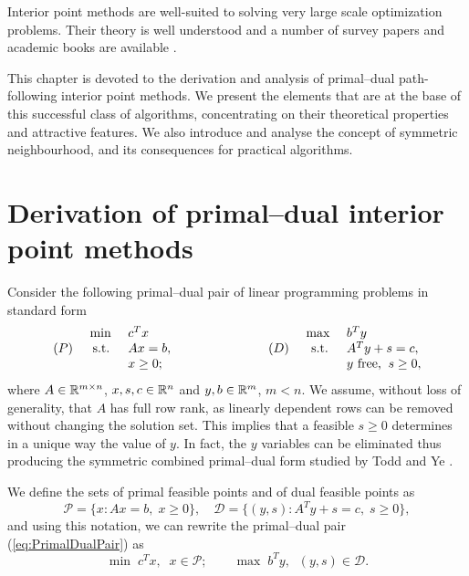 
%
%
\label{ch:Ipm}

Interior point methods are well-suited to solving very
large scale optimization problems. Their theory is well understood
and a number of survey papers and academic books are available
\cite{GondzioTerlaky,Gonzaga92,
RoosTerlakyVial,Terlaky96,MWright92,ipm:Wright97}.

This chapter is devoted to the derivation and analysis of primal--dual
path-following interior point methods. 
We present the elements that are at the base of this successful class
of algorithms, concentrating on their theoretical properties and
attractive features.
We also introduce and analyse the concept of symmetric neighbourhood,
and its consequences for practical algorithms.


%
%
\section{Derivation of primal--dual interior point methods}
\label{sec:Derivation}

Consider the following primal--dual pair of linear programming problems 
in standard form
%
\begin{eqnarray} \label{eq:PrimalDualPair}
  \begin{array}{crlp{2cm}crl}
     & \mbox{ min } & c^T x     &  &     & \mbox{ max }  & b^T y \\
 (P) &\mbox{ s.t. } & Ax = b,   &  & (D) & \mbox{ s.t. } & A^T y + s = c, \\
     &              & x \geq 0; &  &     &   & y \mbox{ free,} \;\; s \geq 0,
  \end{array}
\end{eqnarray}
%
where $A \in \mathbb{R}^{m \times n}$, $x, s, c \in \mathbb{R}^{n}$ 
and $y, b \in \mathbb{R}^{m}$, $m<n$. We assume, without loss of generality,
that $A$ has full row rank, as linearly dependent rows can be
removed without changing the solution set.
This implies that a feasible $s \ge 0$ determines in a unique
way the value of $y$.
In fact, the $y$ variables can be eliminated thus producing the
symmetric combined primal--dual form studied by Todd and Ye \cite{ToddYe90}.

We define the sets of primal feasible points and of
dual feasible points as
\[
\mathcal{P} = \{ x : Ax = b, \; x \ge 0 \}, \quad
\mathcal{D} = \{ (y,s) : A^T y + s = c, \; s \ge 0 \},
\]
and using this notation, we can rewrite the primal--dual pair 
(\ref{eq:PrimalDualPair}) as
\[
\min \; c^T x, \;\;  x    \in \mathcal{P}; \qquad
\max \; b^T y, \;\; (y,s) \in \mathcal{D}.
\]

